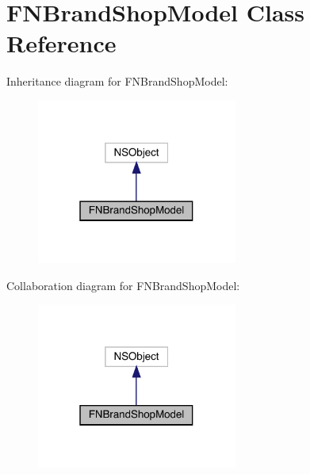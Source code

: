 \hypertarget{interface_f_n_brand_shop_model}{}\section{F\+N\+Brand\+Shop\+Model Class Reference}
\label{interface_f_n_brand_shop_model}


Inheritance diagram for F\+N\+Brand\+Shop\+Model\+:\nopagebreak
\begin{figure}[H]
\begin{center}
\leavevmode
\includegraphics[width=187pt]{interface_f_n_brand_shop_model__inherit__graph}
\end{center}
\end{figure}


Collaboration diagram for F\+N\+Brand\+Shop\+Model\+:\nopagebreak
\begin{figure}[H]
\begin{center}
\leavevmode
\includegraphics[width=187pt]{interface_f_n_brand_shop_model__coll__graph}
\end{center}
\end{figure}
